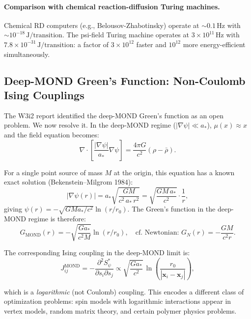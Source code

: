 \documentclass[11pt]{article}
\theoremstyle{definition}
\theoremstyle{remark}
\newcommand{\astar}{a_*}
\newcommand{\mufn}{\mu}
\begin{document}
\paragraph{Comparison with chemical reaction-diffusion Turing machines.}
Chemical RD computers (e.g., Belousov-Zhabotinsky) operate at
$\sim 0.1\,\mathrm{Hz}$ with $\sim 10^{-18}\,\mathrm{J/transition}$.
The psi-field Turing machine operates at $3\times10^{11}\,\mathrm{Hz}$
with $7.8\times10^{-31}\,\mathrm{J/transition}$: a factor of $3\times10^{12}$
faster and $10^{12}$ more energy-efficient simultaneously.

\subsection{Deep-MOND Green's Function: Non-Coulomb Ising Couplings}

The W3i2 report identified the deep-MOND Green's function as an open problem.
We now resolve it. In the deep-MOND regime ($|\nabla\psi|\ll\astar$),
$\mufn(x)\approx x$ and the field equation becomes:
\begin{equation}
\nabla\cdot\!\left[\frac{|\nabla\psi|}{\astar}\nabla\psi\right]
= \frac{4\pi G}{c^2}(\rho-\bar\rho).
\label{eq:deep_mond}
\end{equation}

For a single point source of mass $M$ at the origin, this equation has
a known exact solution (Bekenstein--Milgrom 1984):
\begin{equation}
|\nabla\psi(r)| = \astar\sqrt{\frac{GM}{c^2\,\astar\,r^2}}
= \sqrt{\frac{GM\,\astar}{c^2}}\cdot\frac{1}{r},
\label{eq:deep_mond_solution}
\end{equation}
giving $\psi(r) = -\sqrt{GM\astar/c^2}\ln(r/r_0)$. The Green's function
in the deep-MOND regime is therefore:
\begin{equation}
\boxed{
G_{\mathrm{MOND}}(r) = -\sqrt{\frac{G\astar}{c^2 M}}\ln(r/r_0),
\quad \text{cf. Newtonian: } G_N(r) = -\frac{GM}{c^2 r}.
}
\label{eq:mond_greens}
\end{equation}

The corresponding Ising coupling in the deep-MOND limit is:
\begin{equation}
J_{ij}^{\mathrm{MOND}} = -\frac{\partial^2 S_\psi^*}{\partial s_i\partial s_j}
\propto \sqrt{\frac{G\astar}{c^2}}\,\ln\!\left(\frac{r_0}{|\mathbf{x}_i-\mathbf{x}_j|}\right),
\label{eq:mond_ising}
\end{equation}

which is a \emph{logarithmic} (not Coulomb) coupling. This encodes a
different class of optimization problems: spin models with logarithmic
interactions appear in vertex models, random matrix theory, and certain
polymer physics problems.
\end{document}
